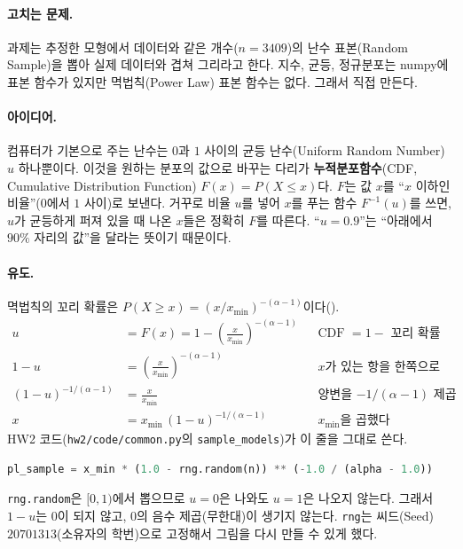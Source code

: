 \documentclass[11pt]{article}
\newcommand{\term}[1]{\textbf{#1}}
\begin{document}
\paragraph{고치는 문제.}
과제는 추정한 모형에서 데이터와 같은 개수($n = 3409$)의 난수 표본(Random Sample)을
뽑아 실제 데이터와 겹쳐 그리라고 한다. 지수, 균등, 정규분포는 numpy에 표본 함수가
있지만 멱법칙(Power Law) 표본 함수는 없다. 그래서 직접 만든다.

\paragraph{아이디어.}
컴퓨터가 기본으로 주는 난수는 $0$과 $1$ 사이의 균등 난수(Uniform Random Number)
$u$ 하나뿐이다. 이것을 원하는 분포의 값으로 바꾸는 다리가 \term{누적분포함수}(CDF,
Cumulative Distribution Function) $F(x) = P(X \le x)$다. $F$는 값 $x$를 ``$x$ 이하인
비율''($0$에서 $1$ 사이)로 보낸다. 거꾸로 비율 $u$를 넣어 $x$를 푸는 함수
$F^{-1}(u)$를 쓰면, $u$가 균등하게 퍼져 있을 때 나온 $x$들은 정확히 $F$를 따른다.
``$u = 0.9$''는 ``아래에서 $90\%$ 자리의 값''을 달라는 뜻이기 때문이다.

\paragraph{유도.}
멱법칙의 꼬리 확률은 $P(X \ge x) = (x/x_{\min})^{-(\alpha-1)}$이다().
\begin{align*}
  u &= F(x) = 1 - \left(\frac{x}{x_{\min}}\right)^{-(\alpha-1)}
    && \text{CDF $= 1 -$ 꼬리 확률}\\
  1 - u &= \left(\frac{x}{x_{\min}}\right)^{-(\alpha-1)}
    && \text{$x$가 있는 항을 한쪽으로}\\
  (1 - u)^{-1/(\alpha-1)} &= \frac{x}{x_{\min}}
    && \text{양변을 $-1/(\alpha-1)$ 제곱}\\
  x &= x_{\min}\,(1 - u)^{-1/(\alpha-1)}
    && \text{$x_{\min}$을 곱했다}
\end{align*}
HW2 코드(\texttt{hw2/code/common.py}의 \texttt{sample\_models})가 이 줄을 그대로 쓴다.
\begin{lstlisting}[language=Python]
pl_sample = x_min * (1.0 - rng.random(n)) ** (-1.0 / (alpha - 1.0))
\end{lstlisting}
\texttt{rng.random}은 $[0, 1)$에서 뽑으므로 $u = 0$은 나와도 $u = 1$은 나오지 않는다.
그래서 $1 - u$는 $0$이 되지 않고, $0$의 음수 제곱(무한대)이 생기지 않는다.
\texttt{rng}는 씨드(Seed) $20701313$(소유자의 학번)으로 고정해서 그림을 다시 만들 수 있게 했다.
\end{document}
